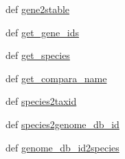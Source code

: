 \begin{DoxyCompactItemize}
def \hyperlink{namespaceel__utils_1_1ensembl_ade37528879f2f0b55b038e86a2dc7f38}{gene2stable}
\item 
def \hyperlink{namespaceel__utils_1_1ensembl_acf331d7b733f38411014df6b090ff9cb}{get\-\_\-gene\-\_\-ids}
\item 
def \hyperlink{namespaceel__utils_1_1ensembl_aee00e910eadafa065894d7d296de2272}{get\-\_\-species}
\item 
def \hyperlink{namespaceel__utils_1_1ensembl_a79999a873369b41eb3dc9bf1a0608606}{get\-\_\-compara\-\_\-name}
\item 
def \hyperlink{namespaceel__utils_1_1ensembl_adc07f8315d3cc44ad43f1bf6b76bed38}{species2taxid}
\item 
def \hyperlink{namespaceel__utils_1_1ensembl_a4b000fdd08b24e3f9c47eb03d4372d0a}{species2genome\-\_\-db\-\_\-id}
\item 
def \hyperlink{namespaceel__utils_1_1ensembl_ac4b940897c49d023e0d562b46e01d53c}{genome\-\_\-db\-\_\-id2species}
\end{DoxyCompactItemize}


